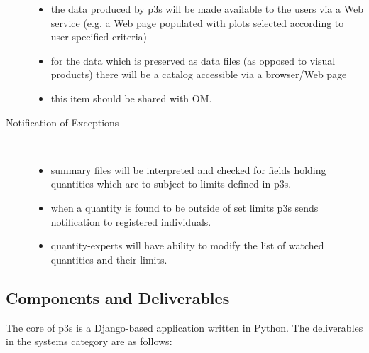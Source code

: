 \documentclass[pdftex,12pt,letter]{article}
\begin{document}
\begin{description}
\begin{itemize}
\item the data produced by p3s will be made available to the users via a Web service
(e.g. a Web page populated with plots selected according to user-specified criteria)

\item for the data which is preserved as data files (as opposed to visual products)
there will be a catalog accessible via a browser/Web page

\item this item should be shared with OM. 

\end{itemize} 

\item[Notification of Exceptions]\ 
\begin{itemize}

\item summary files will be interpreted and checked for fields holding quantities which are to subject to limits defined in p3s.

\item when a quantity is found to be outside of set limits p3s sends notification to registered individuals. 

\item quantity-experts will have ability to modify the list of watched quantities and their limits.

\end{itemize} 

\end{description}

\subsection{Components and Deliverables}

The core of p3s is a Django-based \cite{django} application written in Python. The
deliverables in the systems category are as follows:
\end{document}
